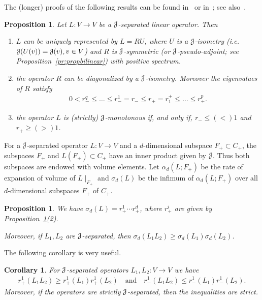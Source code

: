 \documentclass[12pt,reqno]{amsart}
\numberwithin{equation}{section}
\theoremstyle{plain}
\newtheorem{proposition}[theorem]{Proposition}
\newtheorem{corollary}[theorem]{Corollary}
\theoremstyle{definition}
\newcommand{\J}{\EuScript{J}}
\begin{document}
The (longer) proofs of the following results can be found
in~\cite{Wojtk01} or in~\cite{Pota79}; see also~\cite{Wojtk09}.

\begin{proposition}
  \label{pr:J-separated-spectrum}
  Let $L:V\to V$ be a $\J$-separated linear operator. Then
  \begin{enumerate}
  \item $L$ can be uniquely represented by $L=RU$, where $U$
    is a $\J$-isometry (i.e. $\J(U(v))=\J(v), v\in V$) and
    $R$ is $\J$-symmetric (or $\J$-pseudo-adjoint; see
    Proposition~\ref{pr:propbilinear}) with positive
    spectrum.
  \item the operator $R$ can be diagonalized by a
    $\J$-isometry. Moreover the eigenvalues of $R$ satisfy
    \begin{align*}
      0<r_-^q\le\dots\le r_-^1=r_-\le r_+=r_1^+\le\dots\le r_+^p.
    \end{align*}
  \item the operator $L$ is (strictly) $\J$-monotonous if,
    and only if, $r_-\le (<) 1$ and $r_+\ge (>) 1$.
  \end{enumerate}
\end{proposition}

For a $\J$-separated operator $L:V\to V$ and a
$d$-dimensional subspace $F_+\subset C_+$, the subspaces
$F_+$ and $L(F_+)\subset C_+$ have an inner product given by
$\J$. Thus both subspaces are endowed with volume
elements. Let $\alpha_d(L;F_+)$ be the rate of expansion of
volume of $L\mid_{F_+}$ and $\sigma_d(L)$ be the infimum of
$\alpha_d(L;F_+)$ over all $d$-dimensional subspaces $F_+$
of $C_+$.

\begin{proposition}
  \label{pr:product-vol-exp}
  We have $\sigma_d(L)=r_+^1 \cdots r_+^d$, where $r^i_+$
  are given by Proposition~\ref{pr:J-separated-spectrum}(2).

  Moreover, if $L_1,L_2$ are $\J$-separated, then
  $\sigma_d(L_1L_2)\ge\sigma_d(L_1)\sigma_d(L_2)$.
\end{proposition}

The following corollary is very useful.

\begin{corollary}
  \label{cor:compos-max-exp}
  For $\J$-separated operators $L_1,L_2:V\to V$ we have
  \begin{align*}
    r_+^1(L_1L_2)\ge r_+^1(L_1) r_+^1(L_2) \quad\text{and}\quad
    r_-^1(L_1L_2)\le r_-^1(L_1)r_-^1(L_2).
  \end{align*}
  Moreover, if the operators are strictly $\J$-separated,
  then the inequalities are strict.
\end{corollary}
\end{document}
